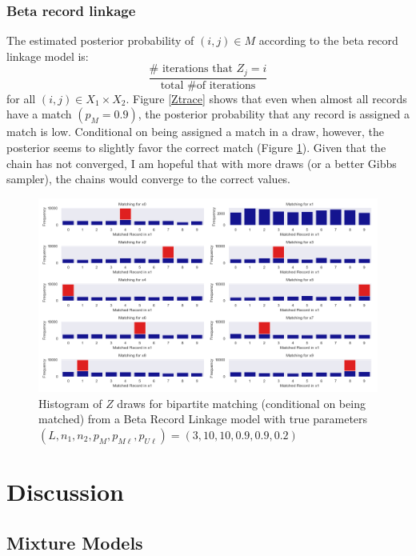 \documentclass[11pt,reqno]{amsart}
\begin{document}
\subsubsection{Beta record linkage} The estimated posterior probability of $(i,j) \in M$ according to the beta record linkage model is:
$$ \frac{\# \text{ iterations that } Z_j = i}{\text{total \# of iterations}} $$
for all $(i,j)\in X_1\times X_2$.  Figure \ref{Ztrace} shows that even when almost all records have a match $(p_M = 0.9)$, the posterior probability that any record is assigned a match is low.  Conditional on being assigned a match in a draw, however, the posterior seems to slightly favor the correct match (Figure \ref{ZtraceCond}). Given that the chain has not converged, I am hopeful that with more draws (or a better Gibbs sampler), the chains would converge to the correct values. 

\begin{figure}[h!]
\begin{center}
\includegraphics[width=\textwidth]{../Figures/bpm/nM9/ZmatchesnM9_L3_cond.png}
\caption{Histogram of $Z$ draws for bipartite matching (conditional on being matched) from a Beta Record Linkage model with true parameters $(L, n_1, n_2, p_M, p_{M\ell}, p_{U\ell}) = (3, 10, 10, 0.9, 0.9, 0.2)$ }
\label{ZtraceCond}
\end{center}
\end{figure}


\section{Discussion}

\subsection{Mixture Models}
\end{document}
